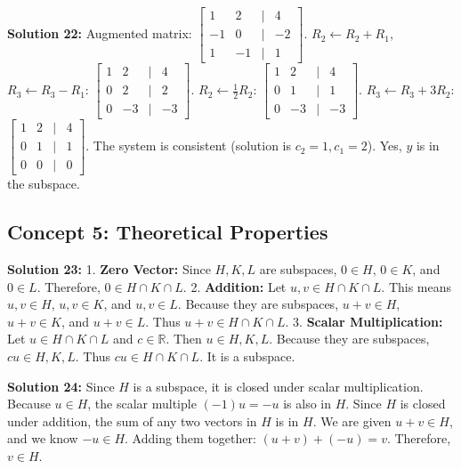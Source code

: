 \documentclass[11pt]{article}
\begin{document}
\vspace{0.3cm}
\textbf{Solution 22:}
Augmented matrix:
$\begin{bmatrix} 1 & 2 & | & 4 \\ -1 & 0 & | & -2 \\ 1 & -1 & | & 1 \end{bmatrix}$.
$R_2 \leftarrow R_2 + R_1$, $R_3 \leftarrow R_3 - R_1$:
$\begin{bmatrix} 1 & 2 & | & 4 \\ 0 & 2 & | & 2 \\ 0 & -3 & | & -3 \end{bmatrix}$.
$R_2 \leftarrow \frac{1}{2}R_2$:
$\begin{bmatrix} 1 & 2 & | & 4 \\ 0 & 1 & | & 1 \\ 0 & -3 & | & -3 \end{bmatrix}$.
$R_3 \leftarrow R_3 + 3R_2$:
$\begin{bmatrix} 1 & 2 & | & 4 \\ 0 & 1 & | & 1 \\ 0 & 0 & | & 0 \end{bmatrix}$.
The system is consistent (solution is $c_2=1, c_1=2$). Yes, $y$ is in the subspace.

\subsection*{Concept 5: Theoretical Properties}

\textbf{Solution 23:}
1. \textbf{Zero Vector:} Since $H, K, L$ are subspaces, $0 \in H$, $0 \in K$, and $0 \in L$. Therefore, $0 \in H \cap K \cap L$.
2. \textbf{Addition:} Let $u, v \in H \cap K \cap L$. This means $u,v \in H$, $u,v \in K$, and $u,v \in L$. Because they are subspaces, $u+v \in H$, $u+v \in K$, and $u+v \in L$. Thus $u+v \in H \cap K \cap L$.
3. \textbf{Scalar Multiplication:} Let $u \in H \cap K \cap L$ and $c \in \mathbb{R}$. Then $u \in H, K, L$. Because they are subspaces, $cu \in H, K, L$. Thus $cu \in H \cap K \cap L$. It is a subspace.

\vspace{0.3cm}
\textbf{Solution 24:}
Since $H$ is a subspace, it is closed under scalar multiplication. Because $u \in H$, the scalar multiple $(-1)u = -u$ is also in $H$.
Since $H$ is closed under addition, the sum of any two vectors in $H$ is in $H$. We are given $u+v \in H$, and we know $-u \in H$.
Adding them together: $(u+v) + (-u) = v$. Therefore, $v \in H$.
\end{document}
